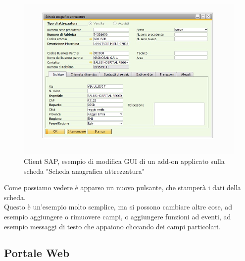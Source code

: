 \begin{figure}[!h] 
	\centering 
	\includegraphics[scale = 0.6]{immagini/esempio-modifica-client-addon.jpg} 
	\caption {Client SAP, esempio di modifica GUI di un add-on applicato sulla scheda "Scheda anagrafica attrezzatura"}
\end{figure}
\begin{flushleft}
	\item Come possiamo vedere è apparso un nuovo pulsante, che stamperà i dati della scheda.\\Questo è un'esempio molto semplice, ma si possono cambiare altre cose, ad esempio aggiungere o rimuovere campi, o aggiungere funzioni ad eventi, ad esempio messaggi di testo che appaiono cliccando dei campi particolari.
\end{flushleft}

\subsection{Portale Web}


